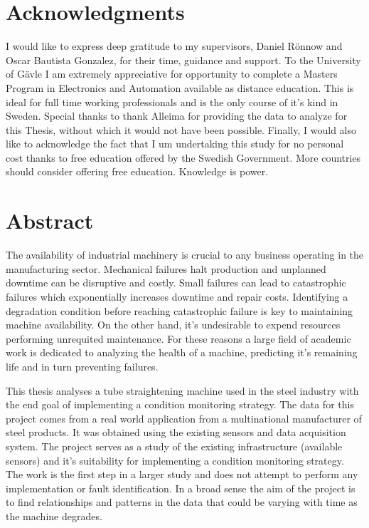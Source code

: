 \documentclass[]{article}
\begin{document}
\setmainfont{Perpetua}

\newpage
\thispagestyle{empty}
\mbox{}
\newpage
{}

\section*{Acknowledgments}
I would like to express deep gratitude to my supervisors, Daniel Rönnow and Oscar Bautista Gonzalez, for their time, guidance and support. To the University of Gävle I am extremely appreciative for opportunity to complete a Masters Program in Electronics and Automation available as distance education. This is ideal for full time working professionals and is the only course of it's kind in Sweden. Special thanks to thank Alleima for providing the data to analyze for this Thesis, without which it would not have been possible. Finally, I would also like to acknowledge the fact that I um undertaking this study for no personal cost thanks to free education offered by the Swedish Government. More countries should consider offering free education. Knowledge is power.
\newpage

\section*{Abstract}
The availability of industrial machinery is crucial to any business operating in the manufacturing sector. Mechanical failures halt production and unplanned downtime can be disruptive and costly. Small failures can lead to catastrophic failures which exponentially increases downtime and repair costs. Identifying a degradation condition before reaching catastrophic failure is key to maintaining machine availability. On the other hand, it's undesirable to expend resources performing unrequited maintenance. For these reasons a large field of academic work is dedicated to analyzing the health of a machine, predicting it's remaining life and in turn preventing failures.

This thesis analyses a tube straightening machine used in the steel industry with the end goal of implementing a condition monitoring strategy. The data for this project comes from a real world application from a multinational manufacturer of steel products. It was obtained using the existing sensors and data acquisition system. The project serves as a study of the existing infrastructure (available sensors) and it's suitability for implementing a condition monitoring strategy. The work is the first step in a larger study and does not attempt to perform any implementation or fault identification. In a broad sense the aim of the project is to find relationships and patterns in the data that could be varying with time as the machine degrades.
\end{document}
